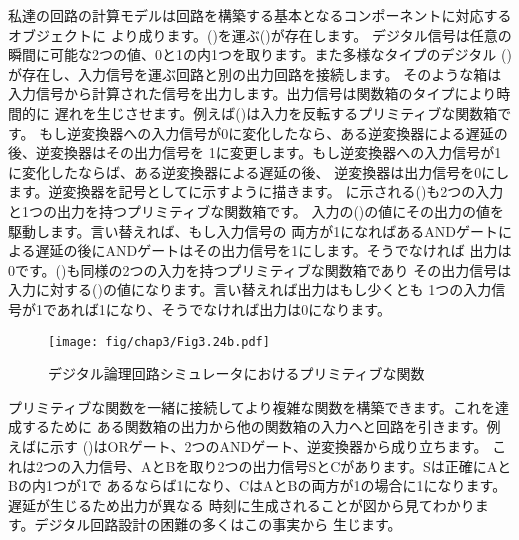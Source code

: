 私達の回路の計算モデルは回路を構築する基本となるコンポーネントに対応するオブジェクトに
より成ります。()を運ぶ()が存在します。
デジタル信号は任意の瞬間に可能な2つの値、0と1の内1つを取ります。また多様なタイプのデジタル
()が存在し、入力信号を運ぶ回路と別の出力回路を接続します。
そのような箱は入力信号から計算された信号を出力します。出力信号は関数箱のタイプにより時間的に
遅れを生じさせます。例えば()は入力を反転するプリミティブな関数箱です。
もし逆変換器への入力信号が0に変化したなら、ある逆変換器による遅延の後、逆変換器はその出力信号を
1に変更します。もし逆変換器への入力信号が1に変化したならば、ある逆変換器による遅延の後、
逆変換器は出力信号を0にします。逆変換器を記号としてに示すように描きます。
に示される()も2つの入力と1つの出力を持つプリミティブな関数箱です。
入力の()の値にその出力の値を駆動します。言い替えれば、もし入力信号の
両方が1になればあるANDゲートによる遅延の後にANDゲートはその出力信号を1にします。そうでなければ
出力は0です。()も同様の2つの入力を持つプリミティブな関数箱であり
その出力信号は入力に対する()の値になります。言い替えれば出力はもし少くとも
1つの入力信号が1であれば1になり、そうでなければ出力は0になります。

\begin{figure}[tb]
\label{Figure 3.24}
\centering
\begin{comment}
\heading{Figure 3.24:} Primitive functions in the digital logic simulator.

\begin{example}
               __          ___
  |\        --|  \       --\  \
--| >o--      |   )--       )  >--
  |/        --|__/       --/__/

Inverter    And-gate     Or-gate
\end{example}
\end{comment}
\texttt{[image: fig/chap3/Fig3.24b.pdf]}
\par\bigskip
\noindent
{} デジタル論理回路シミュレータにおけるプリミティブな関数
\end{figure}

\noindent
プリミティブな関数を一緒に接続してより複雑な関数を構築できます。これを達成するために
ある関数箱の出力から他の関数箱の入力へと回路を引きます。例えばに示す
()はORゲート、2つのANDゲート、逆変換器から成り立ちます。
これは2つの入力信号、AとBを取り2つの出力信号SとCがあります。Sは正確にAとBの内1つが1で
あるならば1になり、CはAとBの両方が1の場合に1になります。遅延が生じるため出力が異なる
時刻に生成されることが図から見てわかります。デジタル回路設計の困難の多くはこの事実から
生じます。

